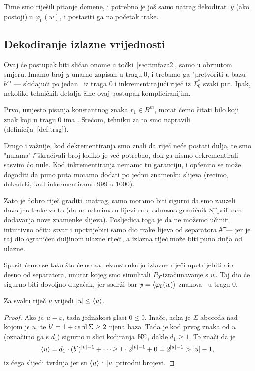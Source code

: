 Time smo riješili pitanje domene, i potrebno je još samo natrag dekodirati $y$ (ako postoji) u $\varphi_0(w)$, i postaviti ga na početak trake.

\subsection{Dekodiranje izlazne vrijednosti}

Ovaj će postupak biti  sličan onome u točki~\ref{sec:tmfaza2}, samo u obrnutom smjeru. Imamo broj $y$ unarno zapisan u tragu $0$, i trebamo ga "pretvoriti u bazu $b'$" --- skidajući po jedan \textbullet\ iz traga $0$ i inkrementirajući riječ iz $\Sigma_0^*$ svaki put. Ipak, nekoliko tehničkih detalja čine ovaj postupak kompliciranijim.

Prvo, umjesto pisanja konstantnog znaka $r_1\in B^m$, morat ćemo čitati bilo koji znak koji u tragu $0$ ima \textbullet. Srećom, tehniku za to smo napravili (definicija~\ref{def:trag}).

Drugo i važnije, kod dekrementiranja smo znali da riječ neće postati dulja, te smo "nulama" \t/ skraćivali broj koliko je već potrebno, dok ga nismo dekrementirali sasvim do nule. Kod inkrementiranja nemamo tu garanciju, i općenito se može dogoditi da puno puta moramo dodati po jednu znamenku slijeva (recimo, dekadski, kad inkrementiramo $999$ u $1000$).

Zato je dobro riječ graditi unatrag, samo moramo biti sigurni da smo zauzeli dovoljno trake za to (da ne udarimo u lijevi rub, odnosno graničnik \t\$, prilikom dodavanja nove znamenke slijeva). Posljedica toga je da ne možemo učiniti intuitivno očitu stvar i upotrijebiti samo dio trake lijevo od separatora \t\#\ ---  jer je taj dio ograničen duljinom ulazne riječi, a izlazna riječ može biti puno dulja od ulazne.

Spasit ćemo se tako što ćemo za rekonstrukciju izlazne riječi upotrijebiti dio desno od separatora, unutar kojeg smo simulirali $P_0$-izračunavanje s $w$. Taj dio će sigurno biti dovoljno dugačak, jer sadrži bar $y=\langle\varphi_0(w)\rangle$ znakova \textbullet\ u tragu $0$.

\begin{lema}\label{lm:dulj<=kr}
Za svaku riječ $u$ vrijedi $\left|u\right|\le\langle u\rangle$.
\end{lema}
\begin{proof}
Ako je $u=\varepsilon$, tada jednakost glasi $0\le 0$. Inače, neka je $\Sigma$ abeceda nad kojom je $u$, te $b'=1+\operatorname{card}\Sigma\ge2$ njena baza. Tada je kod prvog znaka od $u$ (označimo ga s $d_1$) sigurno u slici kodiranja ${\mathbb N}\Sigma$, dakle $d_1\ge 1$. To znači da je
\begin{equation}
    \langle u\rangle=d_1\cdot (b')^{\left|u\right|-1}+\cdots\ge1\cdot2^{\left|u\right|-1}+0=2^{\left|u\right|-1}>\left|u\right|-1\text,
\end{equation}
iz čega slijedi tvrdnja jer su $\langle u\rangle$ i $\left|u\right|$ prirodni brojevi.
\end{proof}


